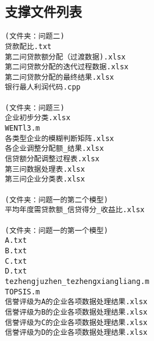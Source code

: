 \documentclass{cumcmthesis}
\begin{document}
\begin{appendices}
\section{支撑文件列表}
\begin{lstlisting}
(文件夹：问题二)
贷款配比.txt
第二问贷款额分配（过渡数据).xlsx
第二问贷款分配的迭代过程数据.xlsx
第二问贷款分配的最终结果.xlsx
银行最人利润代码.cpp

(文件夹：问题三)
企业初步分类.xlsx
WENTl3.m
各类型企业的模糊判断矩阵.xlsx
各企业调整分配额_结果.xlsx
信贷额分配调整过程表.xlsx
第三问数据处理表.xlsx
第三问企业分类表.xlsx

(文件夹：问题一的第二个模型)
平均年度需贷款额_信贷得分_收益比.xlsx

(文件夹：问题一的第一个模型)
A.txt
B.txt
C.txt
D.txt
tezhengjuzhen_tezhengxiangliang.m
TOPSIS.m
信誉评级为A的企业各项数据处理结果.xlsx
信誉评级为B的企业各项数据处理结果.xlsx
信誉评级为C的企业各项数据处理结果.xlsx
信誉评级为D的企业各项数据处理结果.xlsx
\end{lstlisting}

\end{appendices}
\end{document}
